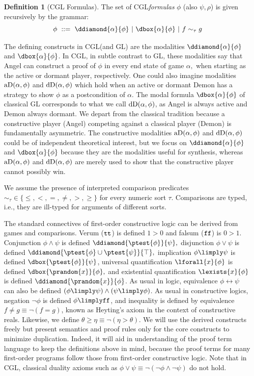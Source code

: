 \documentclass[12pt]{cmuthesis}
\theoremstyle{definition}
\newtheorem{definition}{Definition}
\theoremstyle{remark}
\newcommand{\bebecomes}{\mathrel{::=}}
\newcommand{\alternative}{~|~}
\newcommand{\lequiv}{\leftrightarrow}
\newcommand{\CGL}{\textsf{CGL}\xspace}
\newcommand{\GL}{GL\xspace}
\begin{document}
\begin{definition}[\CGL Formulas]
The set of \CGL \emph{formulas} $\phi$ (also $\psi, \rho$) is given recursively by the grammar:
\[ \phi ~\bebecomes~ \ddiamond{\alpha}{\phi} \alternative \dbox{\alpha}{\phi} \alternative f \sim_\tau g\]
\label{def:cgl-formula}
\end{definition}
The defining constructs in \CGL (and \GL) are the modalities $\ddiamond{\alpha}{\phi}$ and $\dbox{\alpha}{\phi}$.
In \CGL, in subtle contrast to \GL, these modalities say that Angel can construct a proof of $\phi$ in every end state of game $\alpha,$ when starting as the active or dormant player, respectively.
One could also imagine modalities $\textrm{aD}(\alpha,\phi)$ and $\textrm{dD}(\alpha,\phi)$ which hold when an active or dormant Demon has a strategy to show $\phi$ as a postcondition of $\alpha$.
The modal formula $\dbox{\alpha}{\phi}$ of classical \GL corresponds to what we call $\textrm{dD}(\alpha,\phi)$, as Angel is always active and Demon always dormant.
We depart from the classical tradition because a constructive player (Angel) competing against a classical player (Demon) is fundamentally asymmetric.
The constructive modalities $\textrm{aD}(\alpha,\phi)$ and $\textrm{dD}(\alpha,\phi)$ could be of independent theoretical interest, but we focus on $\ddiamond{\alpha}{\phi}$ and $\dbox{\alpha}{\phi}$ because they are the modalities useful for synthesis, whereas $\textrm{aD}(\alpha,\phi)$ and $\textrm{dD}(\alpha,\phi)$ are merely used to show that the constructive player cannot possibly win.

We assume the presence of interpreted comparison predicates $\sim_\tau \in \{\leq, <, =, \neq, >, \geq\}$ for every numeric sort $\tau$.
Comparisons are typed, i.e., they are ill-typed for arguments of different sorts.

The standard connectives of first-order constructive logic can be derived from games and comparisons.
Verum ($\texttt{tt}$) is defined $1 > 0$ and falsum ($\texttt{ff}$) is $0 > 1$.
Conjunction $\phi \land \psi$ is defined $\ddiamond{\ptest{\phi}}{\psi},$ 
disjunction $\phi \lor  \psi$ is defined $\ddiamond{\ptest{\phi} \cup \ptest{\psi}}{\top},$
implication $\phi \limply \psi$ is defined $\dbox{\ptest{\phi}}{\psi}$,
universal quantification $\lforall{x}{\phi}$ is defined $\dbox{\prandom{x}}{\phi},$ and 
existential quantification $\lexists{x}{\phi}$ is defined $\ddiamond{\prandom{x}}{\phi}$.
As usual in logic, equivalence $\phi \lequiv \psi$ can also be defined $(\phi \limply \psi) \land (\psi \limply \phi)$.
As usual in constructive logics, negation $\neg \phi$ is defined $\phi \limply \bff$, and inequality is defined by equivalence $f \neq g \equiv \neg(f = g)$, known as Heyting's axiom in the context of constructive reals.
Likewise, we define $\theta \geq \eta \equiv \neg(\eta > \theta)$.
We will use the derived constructs freely but present semantics and proof rules only for the core constructs to minimize duplication.
Indeed, it will aid in understanding of the proof term language to keep the definitions above in mind, because the proof terms for many first-order programs follow those from first-order constructive logic.
Note that in \CGL, classical duality axioms such as $\phi \lor \psi \equiv \neg(\neg \phi \land \neg \psi)$ do not hold.
\end{document}
